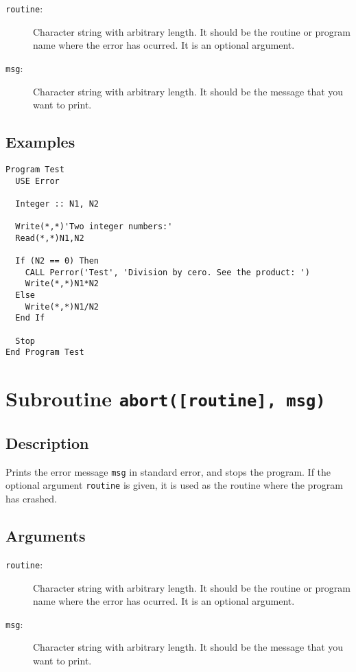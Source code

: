 \begin{description}
\item[\texttt{routine}:] Character string with arbitrary length. It
  should be the routine or program name where the error has
  ocurred. It is an optional argument.
\item[\texttt{msg}:] Character string with arbitrary length. It
  should be the message that you want to print.
\end{description}


\subsection{Examples}

\begin{lstlisting}[emph=perror,
                   emphstyle=\color{blue},
                   frame=trBL,
                   caption=Print error message.,
                   label=perror]
Program Test
  USE Error

  Integer :: N1, N2

  Write(*,*)'Two integer numbers:'
  Read(*,*)N1,N2

  If (N2 == 0) Then
    CALL Perror('Test', 'Division by cero. See the product: ')
    Write(*,*)N1*N2
  Else 
    Write(*,*)N1/N2
  End If

  Stop
End Program Test
\end{lstlisting}

\section{Subroutine \texttt{abort([routine], msg)}}

\subsection{Description}

Prints the error message \texttt{msg} in standard error, and stops the
program. If the optional argument \texttt{routine} is given, it is
used as the routine where the program has crashed.

\subsection{Arguments}

\begin{description}
\item[\texttt{routine}:] Character string with arbitrary length. It
  should be the routine or program name where the error has
  ocurred. It is an optional argument.
\item[\texttt{msg}:] Character string with arbitrary length. It
  should be the message that you want to print.
\end{description}


